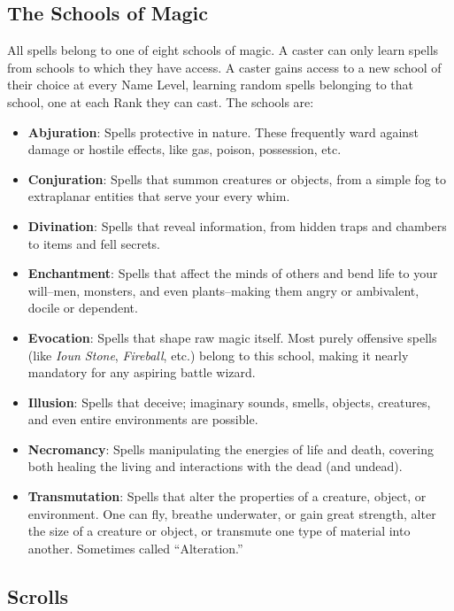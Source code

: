 \documentclass{book}
\providecommand{\tightlist}{%
\setlength{\itemsep}{0pt}\setlength{\parskip}{0pt}}
\begin{document}
\subsection*{The Schools of Magic}\label{the-schools-of-magic}

All spells belong to one of eight schools of magic. A caster can only
learn spells from schools to which they have access. A caster gains
access to a new school of their choice at every Name Level, learning
random spells belonging to that school, one at each Rank they can cast.
The schools are:

\begin{itemize}
	\tightlist
	\item
	\textbf{Abjuration}: Spells protective in nature. These frequently
	ward against damage or hostile effects, like gas, poison, possession,
	etc.
	\item
	\textbf{Conjuration}: Spells that summon creatures or objects, from a
	simple fog to extraplanar entities that serve your every whim.
	\item
	\textbf{Divination}: Spells that reveal information, from hidden traps
	and chambers to items and fell secrets.
	\item
	\textbf{Enchantment}: Spells that affect the minds of others and bend
	life to your will--men, monsters, and even plants--making them angry
	or ambivalent, docile or dependent.
	\item
	\textbf{Evocation}: Spells that shape raw magic itself. Most purely
	offensive spells (like \emph{Ioun Stone}, \emph{Fireball}, etc.)
	belong to this school, making it nearly mandatory for any aspiring
	battle wizard.
	\item
	\textbf{Illusion}: Spells that deceive; imaginary sounds, smells,
	objects, creatures, and even entire environments are possible.
	\item
	\textbf{Necromancy}: Spells manipulating the energies of life and
	death, covering both healing the living and interactions with the dead
	(and undead).
	\item
	\textbf{Transmutation}: Spells that alter the properties of a
	creature, object, or environment. One can fly, breathe underwater, or
	gain great strength, alter the size of a creature or object, or
	transmute one type of material into another. Sometimes called
	``Alteration.''
\end{itemize}

\subsection*{Scrolls}\label{scrolls}
\end{document}
